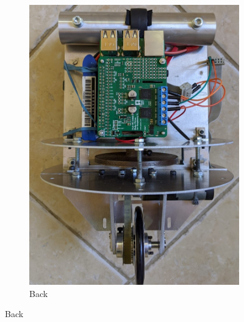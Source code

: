 \documentclass[twoside,twocolumn,12pt]{article}
\begin{document}
\begin{figure}[t!]
\begin{subfigure}[t]{0.325\textwidth}
    \includegraphics[width=\linewidth]{backnew}
    \caption{Back}
  \label{sub:backnew}
  \end{subfigure}
  \newline
  

\end{figure}
\end{document}
